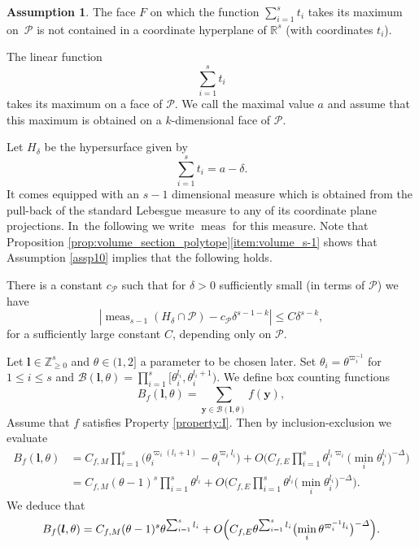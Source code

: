 \documentclass[11pt]{article}
\numberwithin{equation}{section}
\newcommand{\cB}{\mathcal{B}}
\newcommand{\cBlt}{\cB(\bfl,\theta)}
\let\del\delta
\let\vardel\varDelta
\let\tet\theta
\newcommand{\bfy}{\boldsymbol{y}}
\newcommand{\bfl}{\boldsymbol{l}}
\newcommand{\calP}{\mathcal{P}}
\newcommand{\Z}{\mathbb{Z}}
\newcommand\R{\mathbb{R}}
\DeclareMathOperator{\meas}{meas}
\theoremstyle{definition}
\newtheorem{assumption}[theorem]{Assumption}
\numberwithin{theorem}{section}
\begin{document}
\begin{assumption}\label{assp11}
The face $F$ on which the function $\sum_{i=1}^s t_i$ takes its maximum on~$\calP$ is not contained in a coordinate hyperplane of $\R^s$ (with coordinates $t_i$).
\end{assumption}

The linear function
\[
\sum_{i=1}^s t_i
\]
takes its maximum on a face of $\calP$. We call the maximal value $a$ and assume that this maximum is obtained on a $k$-dimensional face of $\calP$.\par

Let $H_{\del}$ be the hypersurface given by
\[
\sum_{i=1}^s t_i=a-\del.
\]
It comes equipped with an $s-1$ dimensional measure which is obtained from the pull-back of the standard Lebesgue measure to any of its coordinate plane projections. In~the following we write $\meas$ for this measure.
Note that Proposition \ref{prop:volume_section_polytope}\eqref{item:volume_s-1} shows that Assumption \ref{assp10} implies that the following holds.
\par\smallskip
There is a constant $c_{\calP}$ such that for $\del >0$ sufficiently small (in terms of $\calP$) we have
\begin{equation}\label{eqn65}
|\meas_{s-1} (H_{\del} \cap \calP)-c_{\calP}\del^{s-1-k}|\leq C\del^{s-k},
\end{equation}
for a sufficiently large constant $C$, depending only on $\calP$.
\par\smallskip
Let $\bfl\in \Z_{\geq 0}^s$ and $\tet\in(1,2]$ a parameter to be chosen later. Set $\tet_i=\tet^{\varpi_i^{-1}}$ for $1\leq i\leq s$ and $\cBlt=\prod_{i=1}^s[\tet_i^{l_i},\tet_i^{l_i+1})$. We define box counting functions
\[
B_f(\bfl,\tet)= \sum_{\bfy\in\cBlt} f(\bfy),
\]
Assume that $f$ satisfies Property \ref{property:I}. Then by inclusion-exclusion we evaluate
\begin{equation*}
\begin{split}
B_f(\bfl,\tet)&= C_{f,M} \prod_{i=1}^s \bigl(\tet_i^{\varpi_i (l_i+1)} - \tet_i^{\varpi_i l_i}\bigr)+O\biggl(C_{f,E} \prod_{i=1}^s \tet_i^{l_i\varpi_i} \bigl(\min_i \tet_i^{l_i}\bigr)^{-\vardel}\biggr)\\
&= C_{f,M} (\tet-1)^s \prod_{i=1}^s \tet^{l_i}+O\biggl(C_{f,E} \prod_{i=1}^s \tet^{l_i} \bigl(\min_i \tet_i^{l_i}\bigr)^{-\vardel}\biggr).
\end{split}
\end{equation*}
We deduce that
\begin{gather*}
B_f(\bfl,\tet)= C_{f,M} (\tet-1)^s \tet^{\sum_{i=1}^s l_i}+O\Bigl(C_{f,E} \tet^{\sum_{i=1}^s l_i} \bigl(\min_i \tet^{\varpi_i^{-1}l_i}\bigr)^{-\vardel}\Bigr).
\end{gather*}
\end{document}
